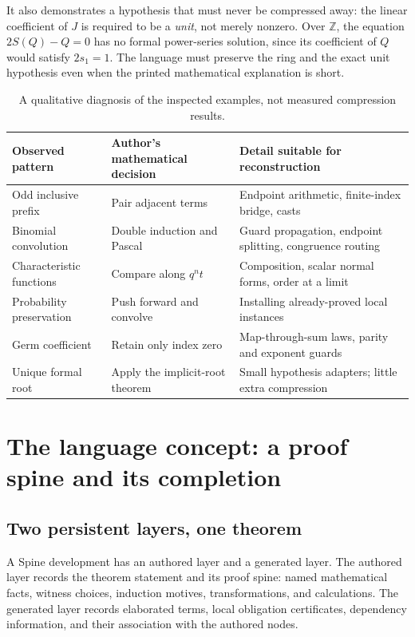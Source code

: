 \documentclass[11pt,letterpaper]{article}
\theoremstyle{definition}
\theoremstyle{remark}
\newcommand{\Z}{\mathbb Z}
\newcommand{\Spine}{Spine}
\begin{document}
It also demonstrates a hypothesis that must never be compressed away: the linear coefficient of $J$ is required to be a \emph{unit}, not merely nonzero. Over $\Z$, the equation $2S(Q)-Q=0$ has no formal power-series solution, since its coefficient of $Q$ would satisfy $2s_1=1$. The language must preserve the ring and the exact unit hypothesis even when the printed mathematical explanation is short.

\begin{table}[htbp]
\centering\small
\begin{tabularx}{\textwidth}{@{}p{}XX@{}}
\toprule
Observed pattern & Author's mathematical decision & Detail suitable for reconstruction\\
\midrule
Odd inclusive prefix & Pair adjacent terms & Endpoint arithmetic, finite-index bridge, casts\\
Binomial convolution & Double induction and Pascal & Guard propagation, endpoint splitting, congruence routing\\
Characteristic functions & Compare along $q^nt$ & Composition, scalar normal forms, order at a limit\\
Probability preservation & Push forward and convolve & Installing already-proved local instances\\
Germ coefficient & Retain only index zero & Map-through-sum laws, parity and exponent guards\\
Unique formal root & Apply the implicit-root theorem & Small hypothesis adapters; little extra compression\\
\bottomrule
\end{tabularx}
\caption{A qualitative diagnosis of the inspected examples, not measured compression results.}
\label{tab:diagnosis}
\end{table}

\section{The language concept: a proof spine and its completion}
\label{sec:concept}
\subsection{Two persistent layers, one theorem}
A \Spine{} development has an authored layer and a generated layer. The authored layer records the theorem statement and its proof spine: named mathematical facts, witness choices, induction motives, transformations, and calculations. The generated layer records elaborated terms, local obligation certificates, dependency information, and their association with the authored nodes.
\end{document}
